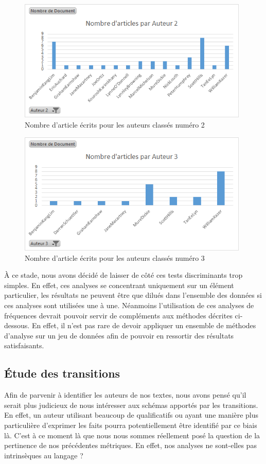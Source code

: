 \documentclass[a4paper,12pt]{report}
\begin{document}
\begin{figure}[H]
\centering
\includegraphics[width=11cm]{fig/Auteur2.png}
\caption{Nombre d'article écrits pour les auteurs classés numéro 2}
\label{auteur2}
\end{figure}

\begin{figure}[H]
\centering
\includegraphics[width=11cm]{fig/Auteur3.png}
\caption{Nombre d'article écrits pour les auteurs classés numéro 3}
\label{auteur3}
\end{figure}


À ce stade, nous avons décidé de laisser de côté ces tests discriminants trop simples. En effet, ces analyses se concentrant uniquement sur un élément particulier, les résultats ne peuvent être que dilués dans l'ensemble des données si ces analyses sont utilisées une à une. Néanmoins l'utilisation de ces analyses de fréquences devrait pouvoir servir de compléments aux méthodes décrites ci-dessous. En effet, il n'est pas rare de devoir appliquer un ensemble de méthodes d'analyse sur un jeu de données afin de pouvoir en ressortir des résultats satisfaisants.


\subsection{Étude des transitions}

Afin de parvenir à identifier les auteurs de nos textes, nous avons pensé qu'il serait plus judicieux de nous intéresser aux schémas apportés par les transitions. En effet, un auteur utilisant beaucoup de qualificatifs ou ayant une manière plus particulière d'exprimer les faits pourra potentiellement être identifié par ce biais là. C'est à ce moment là que nous nous sommes réellement posé la question de la pertinence de nos précédentes métriques. En effet, nos analyses ne sont-elles pas intrinsèques au langage ?
\end{document}
